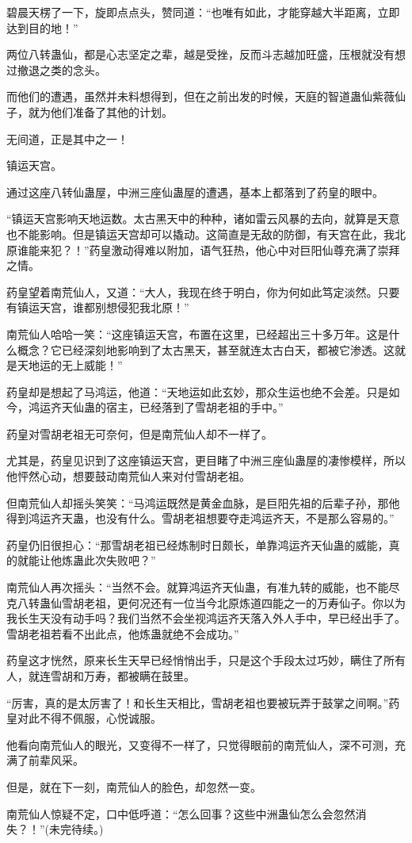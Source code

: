 \begin{this_body}
碧晨天楞了一下，旋即点点头，赞同道：“也唯有如此，才能穿越大半距离，立即达到目的地！”

两位八转蛊仙，都是心志坚定之辈，越是受挫，反而斗志越加旺盛，压根就没有想过撤退之类的念头。

而他们的遭遇，虽然并未料想得到，但在之前出发的时候，天庭的智道蛊仙紫薇仙子，就为他们准备了其他的计划。

无间道，正是其中之一！

镇运天宫。

通过这座八转仙蛊屋，中洲三座仙蛊屋的遭遇，基本上都落到了药皇的眼中。

“镇运天宫影响天地运数。太古黑天中的种种，诸如雷云风暴的去向，就算是天意也不能影响。但是镇运天宫却可以撬动。这简直是无敌的防御，有天宫在此，我北原谁能来犯？！”药皇激动得难以附加，语气狂热，他心中对巨阳仙尊充满了崇拜之情。

药皇望着南荒仙人，又道：“大人，我现在终于明白，你为何如此笃定淡然。只要有镇运天宫，谁都别想侵犯我北原！”

南荒仙人哈哈一笑：“这座镇运天宫，布置在这里，已经超出三十多万年。这是什么概念？它已经深刻地影响到了太古黑天，甚至就连太古白天，都被它渗透。这就是天地运的无上威能！”

药皇却是想起了马鸿运，他道：“天地运如此玄妙，那众生运也绝不会差。只是如今，鸿运齐天仙蛊的宿主，已经落到了雪胡老祖的手中。”

药皇对雪胡老祖无可奈何，但是南荒仙人却不一样了。

尤其是，药皇见识到了这座镇运天宫，更目睹了中洲三座仙蛊屋的凄惨模样，所以他怦然心动，想要鼓动南荒仙人来对付雪胡老祖。

但南荒仙人却摇头笑笑：“马鸿运既然是黄金血脉，是巨阳先祖的后辈子孙，那他得到鸿运齐天蛊，也没有什么。雪胡老祖想要夺走鸿运齐天，不是那么容易的。”

药皇仍旧很担心：“那雪胡老祖已经炼制时日颇长，单靠鸿运齐天仙蛊的威能，真的就能让他炼蛊此次失败吧？”

南荒仙人再次摇头：“当然不会。就算鸿运齐天仙蛊，有准九转的威能，也不能尽克八转蛊仙雪胡老祖，更何况还有一位当今北原炼道四能之一的万寿仙子。你以为我长生天没有动手吗？我们当然不会坐视鸿运齐天落入外人手中，早已经出手了。雪胡老祖若看不出此点，他炼蛊就绝不会成功。”

药皇这才恍然，原来长生天早已经悄悄出手，只是这个手段太过巧妙，瞒住了所有人，就连雪胡和万寿，都被瞒在鼓里。

“厉害，真的是太厉害了！和长生天相比，雪胡老祖也要被玩弄于鼓掌之间啊。”药皇对此不得不佩服，心悦诚服。

他看向南荒仙人的眼光，又变得不一样了，只觉得眼前的南荒仙人，深不可测，充满了前辈风采。

但是，就在下一刻，南荒仙人的脸色，却忽然一变。

南荒仙人惊疑不定，口中低呼道：“怎么回事？这些中洲蛊仙怎么会忽然消失？！”(未完待续。)

\end{this_body}

